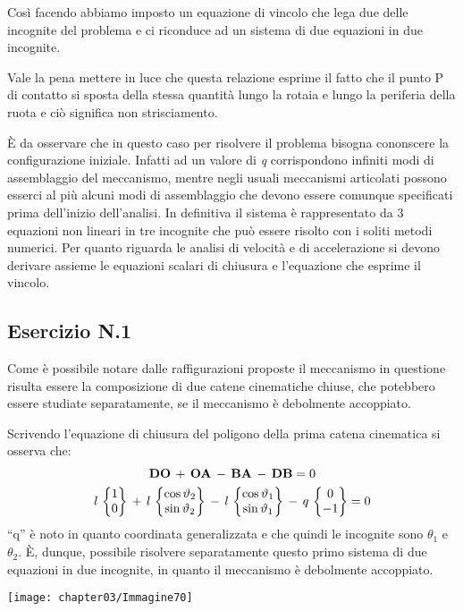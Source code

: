 		Così facendo abbiamo imposto un equazione di vincolo che lega due delle incognite del problema e ci riconduce ad un sistema di due equazioni in due incognite.\newline
		
		Vale la pena mettere in luce che questa relazione esprime il fatto che il punto P di contatto si sposta della stessa quantità lungo la rotaia e lungo la periferia della ruota e ciò significa non strisciamento.
		
		È da osservare che in questo caso per risolvere il problema bisogna cononscere la configurazione iniziale. Infatti ad un valore di \emph{q} corrispondono infiniti modi di assemblaggio del meccanismo, mentre negli usuali meccanismi articolati possono esserci al più alcuni modi di assemblaggio che devono essere comunque specificati prima dell'inizio dell'analisi. In definitiva il sistema è rappresentato da 3 equazioni non lineari in tre incognite che può essere risolto con i soliti metodi numerici. Per quanto riguarda le analisi di velocità e di accelerazione si devono derivare assieme le equazioni scalari di chiusura e l'equazione che esprime il vincolo.
		
		\subsection{Esercizio N.1}
		
		\begin{minipage}{.7\textwidth}
		Come è possibile notare dalle raffigurazioni proposte il meccanismo in questione risulta essere la composizione di due catene cinematiche chiuse, che potebbero essere studiate separatamente, se il meccanismo è debolmente accoppiato.
		
		Scrivendo l'equazione di chiusura del poligono della prima catena cinematica si osserva che:
		\begin{gather*}
			\mathbf{DO}\,+\,\mathbf{OA}\,-\,\mathbf{BA}\,-\,\mathbf{DB}=0\\
			l\,\begin{Bmatrix}1\\0\end{Bmatrix}\,+\,l\,\begin{Bmatrix}\cos{\vartheta_2}\\\sin{\vartheta_2}\end{Bmatrix}\,-\,l\,\begin{Bmatrix}\cos{\vartheta_1}\\\sin{\vartheta_1}\end{Bmatrix}\,-\,q\,\begin{Bmatrix}0\\-1\end{Bmatrix}=0
		\end{gather*}
			``q'' è noto in quanto coordinata generalizzata e che quindi le incognite sono $\theta_1$ e $\theta_2$. È, dunque, possibile risolvere separatamente questo primo sistema di due equazioni in due incognite, in quanto il meccanismo è debolmente accoppiato.
		\end{minipage}
		\hfill
		\begin{minipage}{.3\textwidth}
		\centering
		\texttt{[image: chapter03/Immagine70]}
		\end{minipage}
		
